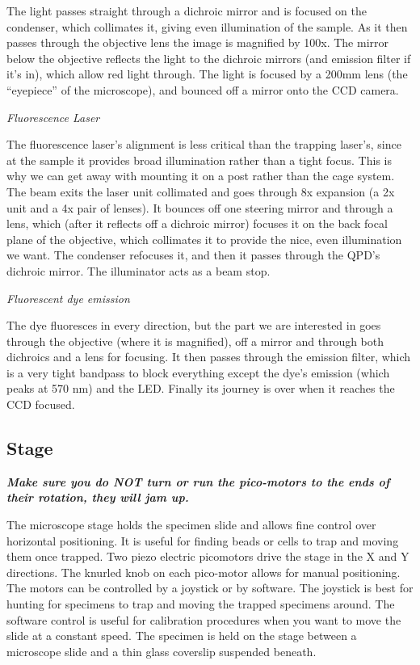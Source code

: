 \documentclass{../lab}
\begin{document}
The light passes straight through a dichroic mirror and is focused on the condenser, which collimates it, giving even illumination of the sample. As it then passes through the objective lens the image is magnified by 100x. The mirror below the objective reflects the light to the dichroic mirrors (and emission filter if it's in), which allow red light through. The light is focused by a 200mm lens (the ``eyepiece'' of the microscope), and bounced off a mirror onto the CCD camera.

\emph{Fluorescence Laser}

The fluorescence laser's alignment is less critical than the trapping laser's, since at the sample it provides broad illumination rather than a tight focus. This is why we can get away with mounting it on a post rather than the cage system. The beam exits the laser unit collimated and goes through 8x expansion (a 2x unit and a 4x pair of lenses). It bounces off one steering mirror and through a lens, which (after it reflects off a dichroic mirror) focuses it on the back focal plane of the objective, which collimates it to provide the nice, even illumination we want. The condenser refocuses it, and then it passes through the QPD's dichroic mirror. The illuminator acts as a beam stop.

\emph{Fluorescent dye emission}

The dye fluoresces in every direction, but the part we are interested in goes through the objective (where it is magnified), off a mirror and through both dichroics and a lens for focusing. It then passes through the emission filter, which is a very tight bandpass to block everything except the dye's emission (which peaks at 570 nm) and the LED. Finally its journey is over when it reaches the CCD focused.

\subsection{Stage}

\emph{\textbf{Make sure you do NOT turn or run the pico-motors to the ends of their rotation, they will jam up.}}

\newpage

The microscope stage holds the specimen slide and allows fine control over horizontal positioning. It is useful for finding beads or cells to trap and moving them once trapped. Two piezo electric picomotors drive the stage in the X and Y directions. The knurled knob on each pico-motor allows for manual positioning. The motors can be controlled by a joystick or by software. The joystick is best for hunting for specimens to trap and moving the trapped specimens around. The software control is useful for calibration procedures when you want to move the slide at a constant speed. The specimen is held on the stage between a microscope slide and a thin glass coverslip suspended beneath.
\end{document}
